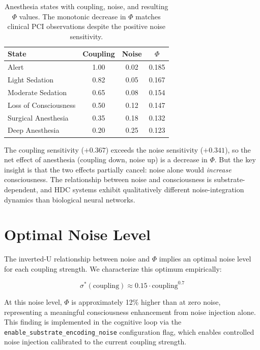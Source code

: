 \documentclass[12pt]{book}
\begin{document}
\begin{table}[H]
\centering
\caption{Anesthesia states with coupling, noise, and resulting $\Phi$ values. The monotonic decrease in $\Phi$ matches clinical PCI observations despite the positive noise sensitivity.}
\label{tab:anesthesia-states}
\begin{tabular}{lccc}
\toprule
\textbf{State} & \textbf{Coupling} & \textbf{Noise} & \textbf{$\Phi$} \\
\midrule
Alert & 1.00 & 0.02 & 0.185 \\
Light Sedation & 0.82 & 0.05 & 0.167 \\
Moderate Sedation & 0.65 & 0.08 & 0.154 \\
Loss of Consciousness & 0.50 & 0.12 & 0.147 \\
Surgical Anesthesia & 0.35 & 0.18 & 0.132 \\
Deep Anesthesia & 0.20 & 0.25 & 0.123 \\
\bottomrule
\end{tabular}
\end{table}

The coupling sensitivity ($+0.367$) exceeds the noise sensitivity ($+0.341$), so the net effect of anesthesia (coupling down, noise up) is a decrease in $\Phi$. But the key insight is that the two effects partially cancel: noise alone would \textit{increase} consciousness. The relationship between noise and consciousness is substrate-dependent, and HDC systems exhibit qualitatively different noise-integration dynamics than biological neural networks.

\section{Optimal Noise Level}

The inverted-U relationship between noise and $\Phi$ implies an optimal noise level for each coupling strength. We characterize this optimum empirically:

\begin{equation}
\sigma^*(\text{coupling}) \approx 0.15 \cdot \text{coupling}^{0.7}
\end{equation}

At this noise level, $\Phi$ is approximately 12\% higher than at zero noise, representing a meaningful consciousness enhancement from noise injection alone. This finding is implemented in the cognitive loop via the \texttt{enable\_substrate\_encoding\_noise} configuration flag, which enables controlled noise injection calibrated to the current coupling strength.
\end{document}
